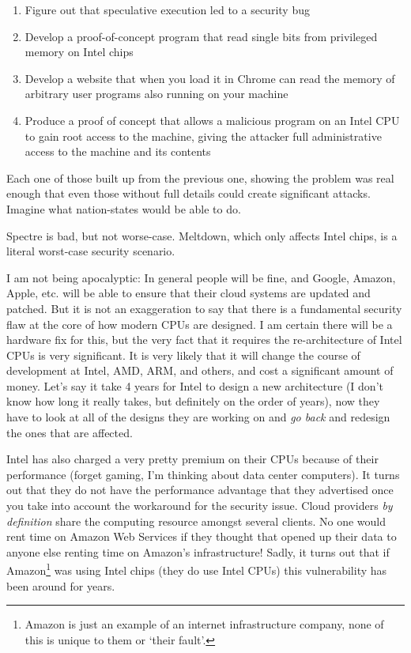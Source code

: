 \documentclass{article}
\begin{document}
\begin{enumerate}
  \item Figure out that speculative execution led to a security bug
  \item Develop a proof-of-concept program that read single bits from
        privileged memory on Intel chips
  \item Develop a website that when you load it in Chrome can read the
        memory of arbitrary user programs also running on your machine
  \item Produce a proof of concept that allows a malicious program on an Intel
        CPU to gain root access to the machine, giving the attacker full
        administrative access to the machine and its contents
\end{enumerate}

Each one of those built up from the previous one, showing the problem was real
enough that even those without full details could create significant attacks.
Imagine what nation-states would be able to do.

Spectre is bad, but not worse-case. Meltdown, which only affects Intel
chips, is a literal worst-case security scenario.

I am not being apocalyptic: In general people will be fine, and Google, Amazon,
Apple, etc. will be able to ensure that their cloud systems are updated and
patched. But it is not an exaggeration to say that there is a fundamental
security flaw at the core of how modern CPUs are designed. I am certain there
will be a hardware fix for this, but the very fact that it requires the
re-architecture of Intel CPUs is very significant. It is very likely that it
will change the course of development at Intel, AMD, ARM, and others, and cost
a significant amount of money. Let's say it take 4 years for Intel to design a
new architecture (I don't know how long it really takes, but definitely on the
order of years), now they have to look at all of the designs they are working
on and \emph{go back} and redesign the ones that are affected.

Intel has also charged a very pretty premium on their CPUs because of their
performance (forget gaming, I'm thinking about data center computers). It turns
out that they do not have the performance advantage that they advertised once
you take into account the workaround for the security issue. Cloud providers
\emph{by definition} share the computing resource amongst several clients. No
one would rent time on Amazon Web Services if they thought that opened up their
data to anyone else renting time on Amazon's infrastructure! Sadly, it turns
out that if Amazon\footnote{Amazon is just an example of an internet
infrastructure company, none of this is unique to them or `their fault'.} was
using Intel chips (they do use Intel CPUs) this vulnerability has been around
for years.
\end{document}
